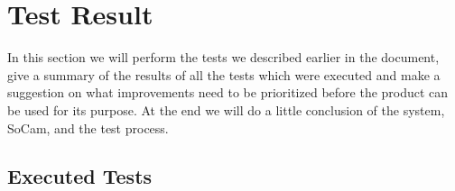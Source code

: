 \chapter{Test Result}
In this section we will perform the tests we described earlier in the document, give a summary of the results of all the tests which were executed and make a suggestion on what improvements need to be prioritized before the product can be used for its purpose. At the end we will do a little conclusion of the system, SoCam, and the test process. 

	\clearpage

	\section{Executed Tests}
	\begin{center}
		

\end{center}
